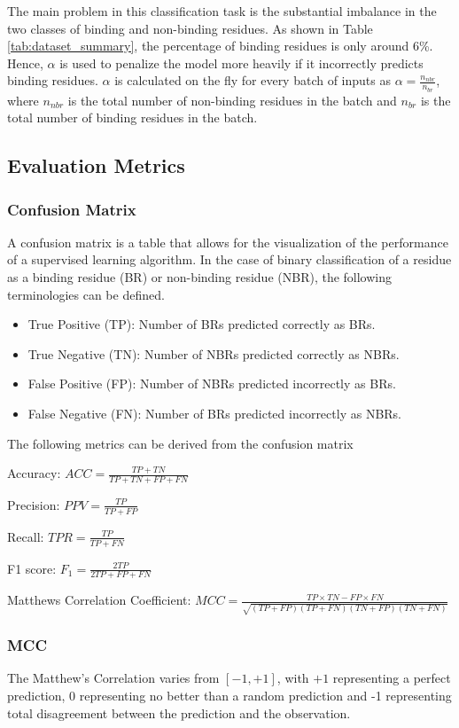 \documentclass[journal=jacsat,manuscript=article]{achemso}
\begin{document}
The main problem in this classification task is the substantial imbalance in the two classes of binding and non-binding residues. As shown in Table \ref{tab:dataset_summary}, the percentage of binding residues is only around 6\%. Hence, $\alpha$ is used to penalize the model more heavily if it incorrectly predicts binding residues. $\alpha$ is calculated on the fly for every batch of inputs as $\alpha = \frac{n_{nbr}}{n_{br}}$, where $n_{nbr}$ is the total number of non-binding residues in the batch and $n_{br}$ is the total number of binding residues in the batch.

\subsection{Evaluation Metrics}
\subsubsection{Confusion Matrix}
A confusion matrix is a table that allows for the visualization of the performance of a supervised learning algorithm. In the case of binary classification of a residue as a binding residue (BR) or non-binding residue (NBR), the following terminologies can be defined.
\begin{itemize}
    \item True Positive (TP): Number of BRs predicted correctly as BRs.
    \item True Negative (TN): Number of NBRs predicted correctly as NBRs.
    \item False Positive (FP): Number of NBRs predicted incorrectly as BRs.
    \item False Negative (FN): Number of BRs predicted incorrectly as NBRs.
\end{itemize}

\noindent The following metrics can be derived from the confusion matrix

Accuracy: ${ACC} = \frac{TP + TN}{TP + TN + FP + FN}$

Precision: ${PPV} = \frac{TP}{TP + FP}$

Recall: ${TPR} = \frac{TP}{TP + FN}$

F1 score: ${F_1} = \frac{2TP}{2TP + FP + FN}$

Matthews Correlation Coefficient: ${MCC} = \frac{TP \times TN - FP \times FN}{\sqrt{(TP + FP)(TP + FN)(TN + FP)(TN + FN)}}$

\subsubsection{MCC}
\quad The Matthew's Correlation varies from $[-1, +1]$, with $+1$ representing a perfect prediction, 0 representing no better than a random prediction and -1 representing total disagreement between the prediction and the observation.
\end{document}

